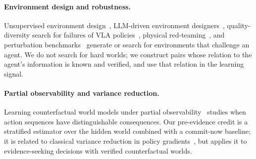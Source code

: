 \paragraph{Environment design and robustness.}
Unsupervised environment design~\cite{paired2020,accel2022}, LLM-driven environment designers~\cite{spade2026,simworldstudio2026}, quality-diversity search for failures of VLA policies~\cite{qdeg2026}, physical red-teaming~\cite{redvla2026}, and perturbation benchmarks~\cite{liberoplus2026} generate or search for environments that challenge an agent.
We do not search for hard worlds; we construct pairs whose relation to the agent's information is known and verified, and use that relation in the learning signal.

\paragraph{Partial observability and variance reduction.}
Learning counterfactual world models under partial observability~\cite{clwm2026} studies when action sequences have distinguishable consequences.
Our pre-evidence credit is a stratified estimator over the hidden world combined with a commit-now baseline; it is related to classical variance reduction in policy gradients~\cite{gae2016}, but applies it to evidence-seeking decisions with verified counterfactual worlds.
